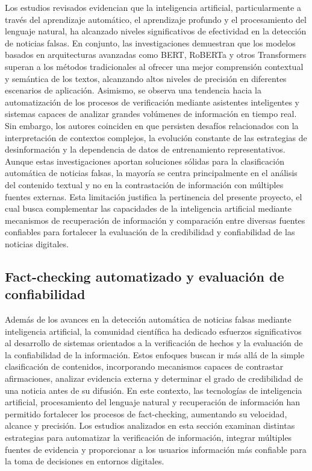 \documentclass[12pt]{article}
\begin{document}
Los estudios revisados evidencian que la inteligencia artificial, particularmente a través del aprendizaje automático, el aprendizaje profundo y el procesamiento del lenguaje natural, ha alcanzado niveles significativos de efectividad en la detección de noticias falsas. En conjunto, las investigaciones demuestran que los modelos basados en arquitecturas avanzadas como BERT, RoBERTa y otros Transformers superan a los métodos tradicionales al ofrecer una mejor comprensión contextual y semántica de los textos, alcanzando altos niveles de precisión en diferentes escenarios de aplicación. Asimismo, se observa una tendencia hacia la automatización de los procesos de verificación mediante asistentes inteligentes y sistemas capaces de analizar grandes volúmenes de información en tiempo real. Sin embargo, los autores coinciden en que persisten desafíos relacionados con la interpretación de contextos complejos, la evolución constante de las estrategias de desinformación y la dependencia de datos de entrenamiento representativos. Aunque estas investigaciones aportan soluciones sólidas para la clasificación automática de noticias falsas, la mayoría se centra principalmente en el análisis del contenido textual y no en la contrastación de información con múltiples fuentes externas. Esta limitación justifica la pertinencia del presente proyecto, el cual busca complementar las capacidades de la inteligencia artificial mediante mecanismos de recuperación de información y comparación entre diversas fuentes confiables para fortalecer la evaluación de la credibilidad y confiabilidad de las noticias digitales.

\subsection*{Fact-checking automatizado y evaluación de confiabilidad}

Además de los avances en la detección automática de noticias falsas mediante inteligencia artificial, la comunidad científica ha dedicado esfuerzos significativos al desarrollo de sistemas orientados a la verificación de hechos y la evaluación de la confiabilidad de la información. Estos enfoques buscan ir más allá de la simple clasificación de contenidos, incorporando mecanismos capaces de contrastar afirmaciones, analizar evidencia externa y determinar el grado de credibilidad de una noticia antes de su difusión. En este contexto, las tecnologías de inteligencia artificial, procesamiento del lenguaje natural y recuperación de información han permitido fortalecer los procesos de fact-checking, aumentando su velocidad, alcance y precisión. Los estudios analizados en esta sección examinan distintas estrategias para automatizar la verificación de información, integrar múltiples fuentes de evidencia y proporcionar a los usuarios información más confiable para la toma de decisiones en entornos digitales. 
\end{document}
